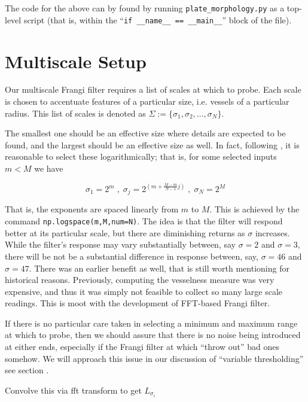 	The code for the above can by found by running \texttt{plate\_morphology.py} as a top-level script (that is, within the ``\texttt{if \_\_name\_\_ == \_\_main\_\_}'' block of the file).
\section{Multiscale Setup}

	Our multiscale Frangi filter requires a list of scales at which to probe. Each scale is chosen to accentuate features of a particular size, i.e. vessels of a particular radius. This  list of scales is denoted as $\Sigma := \{ \sigma_1, \sigma_2, \dots, \sigma_N\}$. 
	 
	The smallest one should be an effective size where details are expected to be found, and the largest should be an effective size as well. In fact, following , it is reasonable to select these logarithmically; that is,
	for some selected inputs $m < M$ we have
	
	\begin{equation}
	\sigma_1 = 2^{m} \; , \; \sigma_{j} = 2^{\left(m+\frac{M-m}{N-1}j\right)} \; , \; \sigma_N = 2^{M} \end{equation}
	
	That is, the exponents are spaced linearly from $m$ to $M$. This is achieved by the command
	\texttt{np.logspace(m,M,num=N)}. The idea is that the filter will respond better at its particular scale, but there are diminishing returns as $\sigma$ increases. While the filter's response may vary substantially between, say $\sigma=2$ and $\sigma=3$, there will be not be a substantial difference in response between, say, $\sigma=46$ and $\sigma=47$. There was an earlier benefit as well, that is still worth mentioning for historical reasons. Previously, computing the vesselness measure was very expensive, and thus it was simply not feasible to collect so many large scale readings. This is moot with the development of FFT-based Frangi filter.
	
	If there is no particular care taken in selecting a minimum and maximum range at which to probe, then we should assure that there is no noise being introduced at either ends, especially if the Frangi filter at which   ``throw out'' bad ones somehow. We will approach this issue in our discussion of ``variable thresholding'' see section .
	
	
	
	
	
	Convolve this via fft transform to get $L_{\sigma_i}$
	

